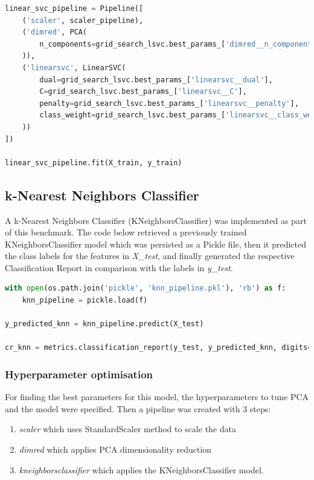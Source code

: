 \documentclass{article}
\begin{document}
\begin{lstlisting}[language=Python]
linear_svc_pipeline = Pipeline([
    ('scaler', scaler_pipeline), 
    ('dimred', PCA(
        n_components=grid_search_lsvc.best_params_['dimred__n_components']
    )),
    ('linearsvc', LinearSVC(
        dual=grid_search_lsvc.best_params_['linearsvc__dual'],
        C=grid_search_lsvc.best_params_['linearsvc__C'],
        penalty=grid_search_lsvc.best_params_['linearsvc__penalty'],
        class_weight=grid_search_lsvc.best_params_['linearsvc__class_weight']
    ))
])

linear_svc_pipeline.fit(X_train, y_train)
\end{lstlisting}

\subsection{k-Nearest Neighbors Classifier}
A k-Nearest Neighbors Classifier (KNeighborsClassifier) was implemented as part of this benchmark. The code below retrieved a previously trained KNeighborsClassifier model which was persisted as a Pickle file, then it predicted the class labels for the features in \emph{X\_test}, and finally generated the respective Classification Report in comparison with the labels in \emph{y\_test}.

\begin{lstlisting}[language=Python]
with open(os.path.join('pickle', 'knn_pipeline.pkl'), 'rb') as f:    
    knn_pipeline = pickle.load(f)
    
y_predicted_knn = knn_pipeline.predict(X_test)

cr_knn = metrics.classification_report(y_test, y_predicted_knn, digits=5)    
\end{lstlisting}

\subsubsection{Hyperparameter optimisation}
For finding the best parameters for this model, the hyperparameters to tune PCA and the model were specified. Then a pipeline was created with 3 steps:
\begin{enumerate}
\item \emph{scaler} which uses StandardScaler method to scale the data
\item \emph{dimred} which applies PCA dimensionality reduction
\item \emph{kneighborsclassifier} which applies the KNeighborsClassifier model.
\end{enumerate}
\end{document}
